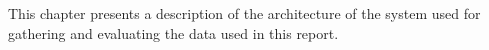 This chapter presents a description of the architecture of the system used for gathering and evaluating the data used in this report.